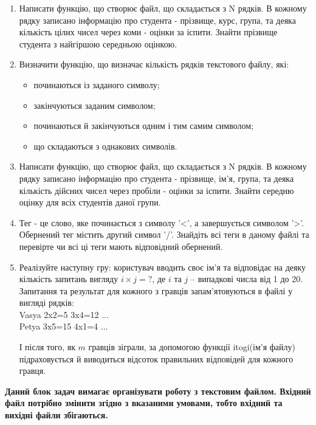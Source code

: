 \documentclass[a5paper,titlepage,openany,twoside,
]
{book_unv}%
\begin{document}
\begin{enumerate}
\def\labelenumi{\arabic{enumi})}
\setcounter{enumi}{4}

\item
  Написати функцію, що створює файл, що складається з N рядків. В кожному рядку
записано інформацію про студента - прізвище, курс, група, та деяка 
кількість цілих чисел через коми - оцінки за іспити.
Знайти прізвище студента з найгіршою середньою оцінкою.

\item
Визначити функцію, що визначає кількість рядків текстового файлу,
які:
\begin{itemize}
\item починаються із заданого символу;
\item закінчуються заданим символом;
\item починаються й закінчуються одним і тим самим символом;
\item що складаються з однакових символів.
\end{itemize}

\item
  Написати функцію, що створює файл, що складається з N рядків. В кожному рядку
записано інформацію про студента - прізвище, ім'я, група, та деяка 
кількість дійсних чисел через пробіли - оцінки за іспити.
Знайти середню оцінку для всіх студентів даної групи.

\item
Тег - це слово, яке починається з символу '\textless{}', а завершується
символом '\textgreater{}'. Обернений тег містить другий символ '/'.
 Знайдіть всі теги в даному файлі та перевірте чи всі
ці теги мають відповідний обернений.

\item
Реалізуйте наступну гру: користувач вводить своє ім'я та відповідає на 
деяку кількість запитань вигляду $i \times j=?$, де $i$ та $j$ -- випадкові числа від 1 до 20.
Запитання та результат для кожного з гравців запам'ятовуються в файлі у вигляді рядків:\\
Vasya 2x2=5 3x4=12 ... \\
Petya 3x5=15 4x1=4 ...

І після того, як $m$ гравців зіграли, за допомогою функції itogi(ім'я файлу) підраховується й виводиться
 відсоток правильних відповідей для кожного гравця.

\end{enumerate}
\textbf{Даний блок задач вимагає організувати роботу з текстовим файлом. 
Вхідний файл потрібно змінити згідно з вказаними умовами, тобто вхідний та вихідні файли
збігаються.}
\end{document}
